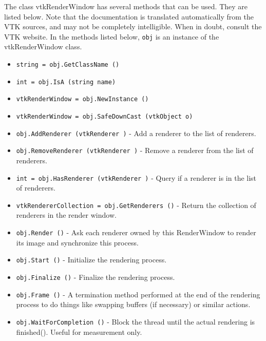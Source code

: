 The class vtkRenderWindow has several methods that can be used.
  They are listed below.
Note that the documentation is translated automatically from the VTK sources,
and may not be completely intelligible.  When in doubt, consult the VTK website.
In the methods listed below, \verb|obj| is an instance of the vtkRenderWindow class.
\begin{itemize}
\item  \verb|string = obj.GetClassName ()|

\item  \verb|int = obj.IsA (string name)|

\item  \verb|vtkRenderWindow = obj.NewInstance ()|

\item  \verb|vtkRenderWindow = obj.SafeDownCast (vtkObject o)|

\item  \verb|obj.AddRenderer (vtkRenderer )| -  Add a renderer to the list of renderers.

\item  \verb|obj.RemoveRenderer (vtkRenderer )| -  Remove a renderer from the list of renderers.

\item  \verb|int = obj.HasRenderer (vtkRenderer )| -  Query if a renderer is in the list of renderers.

\item  \verb|vtkRendererCollection = obj.GetRenderers ()| -  Return the collection of renderers in the render window.

\item  \verb|obj.Render ()| -  Ask each renderer owned by this RenderWindow to render its image and
 synchronize this process.

\item  \verb|obj.Start ()| -  Initialize the rendering process.

\item  \verb|obj.Finalize ()| -  Finalize the rendering process.

\item  \verb|obj.Frame ()| -  A termination method performed at the end of the rendering process
 to do things like swapping buffers (if necessary) or similar actions.

\item  \verb|obj.WaitForCompletion ()| -  Block the thread until the actual rendering is finished().
 Useful for measurement only.


\end{itemize}
